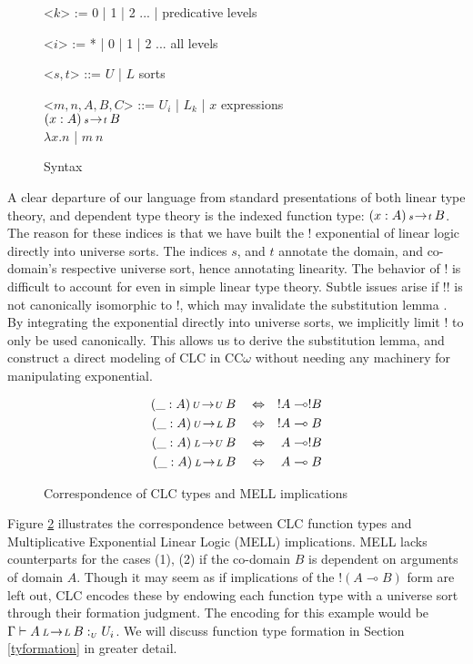 \documentclass{article}
\theoremstyle{definition}
\newcommand{\indalt}[1][2]{\\\hspace*{-1.2em}\textbar\quad}
\newcommand{\utype}{:_{\scriptscriptstyle U}}
\newcommand{\arw}[2]
{\hspace*{0.2em}{\scriptstyle #1}\hspace*{-0.2em}
\rightarrow
\hspace*{-0.2em}{\scriptstyle #2}\hspace*{0.2em}}
\begin{document}
  \begin{figure}[H]
    \caption{Syntax}
    \centering
    \begin{minipage}{0.8\linewidth}
    \begin{grammar}
      <$k$> := 0 | 1 | 2 ... | \phantom{*} \hspace*{5.8em} predicative levels

      <$i$> := * | 0 | 1 | 2 ... \hspace*{5.8em} all levels

      <$s, t$> ::= $U$ | $L$ \phantom{| $x$} \hspace*{8em} sorts

      <$m, n, A, B, C$> ::= $U_i$ | $L_k$ | $x$ \hspace*{7.3em} expressions
      \indalt $(x : A) \arw{s}{t} B$
      \indalt $\lambda x. n$ | $m\ n$
    \end{grammar}
    \end{minipage}
    \label{syntax}
  \end{figure}
  A clear departure of our language from standard presentations of both linear type theory, and dependent type theory is the indexed function type: $(x : A) \arw{s}{t} B$. The reason for these indices is that we have built the ! exponential of linear logic directly into universe sorts. The indices $s$, and $t$ annotate the domain, and co-domain's respective universe sort, hence annotating linearity. The behavior of ! is difficult to account for even in simple linear type theory. Subtle issues arise if !! is not canonically isomorphic to !, which may invalidate the substitution lemma \cite{substitute}. By integrating the exponential directly into universe sorts, we implicitly limit ! to only be used canonically. This allows us to derive the substitution lemma, and construct a direct modeling of CLC in CC$\omega$ without needing any machinery for manipulating exponential.
  \begin{figure}[H]
    \caption{Correspondence of CLC types and MELL implications}
    \begin{align}
      (\_ : A) \arw{U}{U} B \quad &\Leftrightarrow \quad !A \multimap !B \\
      (\_ : A) \arw{U}{L} B \quad &\Leftrightarrow \quad !A \multimap B \\
      (\_ : A) \arw{L}{U} B \quad &\Leftrightarrow \quad A \multimap !B \\
      (\_ : A) \arw{L}{L} B \quad &\Leftrightarrow \quad A \multimap B
    \end{align}
    \label{correspondence}
  \end{figure}
  Figure \ref{correspondence} illustrates the correspondence between CLC function types and Multiplicative Exponential Linear Logic (MELL) implications. MELL lacks counterparts for the cases (1), (2) if the co-domain $B$ is dependent on arguments of domain $A$. Though it may seem as if implications of the $!(A \multimap B)$ form are left out, CLC encodes these by endowing each function type with a universe sort through their formation judgment. The encoding for this example would be $\Gamma \vdash A \arw{L}{L} B \utype U_i $. We will discuss function type formation in Section \ref{tyformation} in greater detail.
\end{document}
